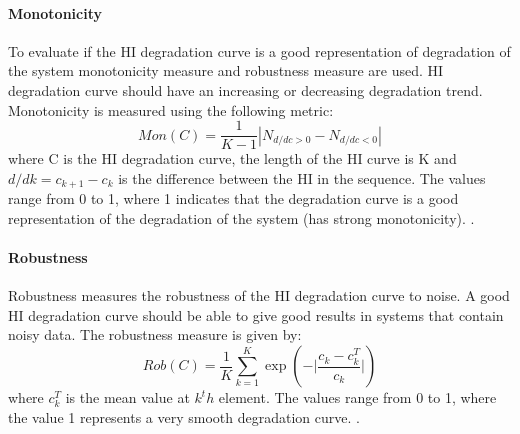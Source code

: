 \paragraph{Monotonicity}
To evaluate if the HI degradation curve is a good representation of degradation of the system monotonicity measure and robustness measure are used. HI degradation curve should have an
increasing or decreasing degradation trend. Monotonicity is measured using the following metric:
\begin{equation}
    Mon(C) = \frac{1}{K-1}|N_{d/dc>0}-N_{d/dc<0}|
\end{equation}
where C is the HI degradation curve, the length of the HI curve is K and $d/dk=c_{k+1} - c_k$ is the difference between the HI in the sequence. The values range from 0 to 1,
where 1 indicates that the degradation curve is a good representation of the degradation
of the system (has strong monotonicity).
\cite{DBLP:conf/indin/AremuOHM19}.

\paragraph{Robustness}
Robustness measures the robustness of the HI degradation curve to noise. A good HI degradation
curve should be able to give good results in systems that
contain noisy data. The robustness measure is given by:
\begin{equation}
    Rob(C) = \frac{1}{K} \sum_{k=1}^K \exp \left(-\bigg| \frac{c_k-c_k^T}{c_k} \bigg|\right)
\end{equation}
where  $c_k^T$ is the mean value at $k^th$ element. The values range from 0 to 1, where
the value 1 represents a very smooth degradation curve.
\cite{DBLP:conf/indin/AremuOHM19}.